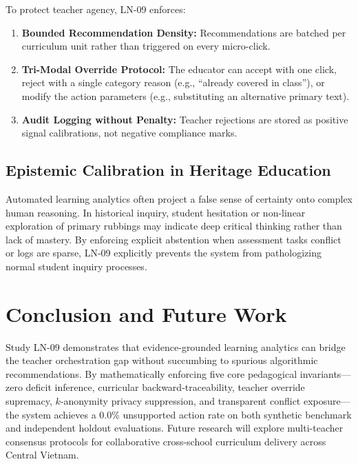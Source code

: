 \documentclass[11pt,a4paper]{article}
\begin{document}
To protect teacher agency, LN-09 enforces:
\begin{enumerate}
    \item \textbf{Bounded Recommendation Density:} Recommendations are batched per curriculum unit rather than triggered on every micro-click.
    \item \textbf{Tri-Modal Override Protocol:} The educator can accept with one click, reject with a single category reason (e.g., ``already covered in class''), or modify the action parameters (e.g., substituting an alternative primary text).
    \item \textbf{Audit Logging without Penalty:} Teacher rejections are stored as positive signal calibrations, not negative compliance marks.
\end{enumerate}

\subsection{Epistemic Calibration in Heritage Education}
Automated learning analytics often project a false sense of certainty onto complex human reasoning. In historical inquiry, student hesitation or non-linear exploration of primary rubbings may indicate deep critical thinking rather than lack of mastery. By enforcing explicit abstention when assessment tasks conflict or logs are sparse, LN-09 explicitly prevents the system from pathologizing normal student inquiry processes.

\section{Conclusion and Future Work}
Study LN-09 demonstrates that evidence-grounded learning analytics can bridge the teacher orchestration gap without succumbing to spurious algorithmic recommendations. By mathematically enforcing five core pedagogical invariants—zero deficit inference, curricular backward-traceability, teacher override supremacy, $k$-anonymity privacy suppression, and transparent conflict exposure—the system achieves a $0.0\%$ unsupported action rate on both synthetic benchmark and independent holdout evaluations. Future research will explore multi-teacher consensus protocols for collaborative cross-school curriculum delivery across Central Vietnam.
\end{document}
